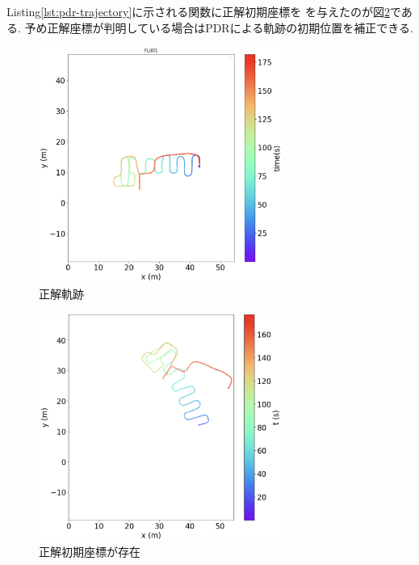 Listing\ref{lst:pdr-trajectory}に示される関数に正解初期座標を
を与えたのが図\ref{fig:pdr-move}である.
予め正解座標が判明している場合はPDRによる軌跡の初期位置を補正できる.

\begin{figure}[ht]
	\centering
	\includegraphics[width=80mm]{image/gt2.jpg}
	\caption{正解軌跡}    \label{fig:gt-trajectory}
\end{figure}

\begin{figure}[ht]
	\centering
	\includegraphics[width=80mm]{image/pdr-move.jpg}
	\caption{正解初期座標が存在}    \label{fig:pdr-move}
\end{figure}
